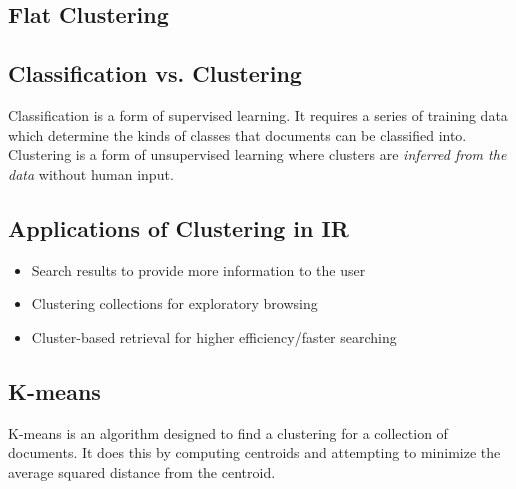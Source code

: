 \documentclass{article}%
\begin{document}
\begin{enumerate}
\begin{enumerate}
\begin{enumerate}
\section*{Flat Clustering}
\subsection*{Classification vs. Clustering}
Classification is a form of supervised learning. It requires a series of training data which determine the
kinds of classes that documents can be classified into. Clustering is a form of unsupervised learning where
clusters are \textit{inferred from the data} without human input.
\subsection*{Applications of Clustering in IR}
\begin{itemize}
    \item Search results to provide more information to the user
    \item Clustering collections for exploratory browsing
    \item Cluster-based retrieval for higher efficiency/faster searching
\end{itemize}
\subsection*{K-means}
K-means is an algorithm designed to find a clustering for a collection of documents. It does this by computing
centroids and attempting to minimize the average squared distance from the centroid.\\


\end{enumerate}
\end{enumerate}
\end{enumerate}
\end{document}
